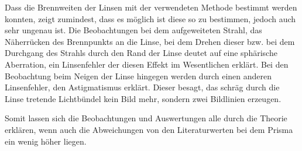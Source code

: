 		Dass die Brennweiten der Linsen mit der verwendeten Methode bestimmt werden konnten, zeigt zumindest, dass es möglich ist diese so zu bestimmen, jedoch auch sehr ungenau ist.
		Die Beobachtungen bei dem aufgeweiteten Strahl, das Näherrücken des Brennpunkts an die Linse, bei dem Drehen dieser bzw. bei dem Durchgang des Strahls durch den Rand der Linse deutet auf eine sphärische Aberration, ein Linsenfehler der diesen Effekt im Wesentlichen erklärt.
		Bei den Beobachtung beim Neigen der Linse hingegen werden durch einen anderen Linsenfehler, den Astigmatismus erklärt.
		Dieser besagt, das schräg durch die Linse tretende Lichtbündel kein Bild mehr, sondern zwei Bildlinien erzeugen.
		
		Somit lassen sich die Beobachtungen und Auswertungen alle durch die Theorie erklären, wenn auch die Abweichungen von den Literaturwerten bei dem Prisma ein wenig höher liegen.